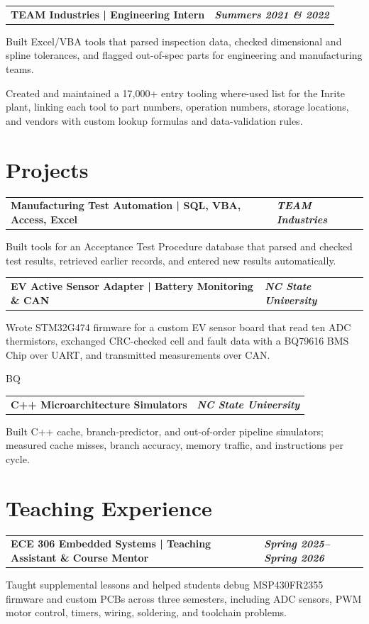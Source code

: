 \documentclass[10pt,letterpaper]{article}
\makeatletter
\newcommand{\resumeentry}[2]{%
  \begin{tabularx}{\textwidth}{@{}X>{\raggedleft\arraybackslash}p{2.40in}@{}}
    \textbf{#1} & \textbf{\textit{#2}}
  \end{tabularx}\vspace{-0.075cm}
}
\makeatother
\begin{document}
\resumeentry{TEAM Industries | Engineering Intern}{Summers 2021 \& 2022}
\begin{resumebullets}
  \item Built Excel/VBA tools that parsed inspection data, checked dimensional and spline tolerances, and flagged out-of-spec parts for engineering and manufacturing teams.
  \item Created and maintained a 17,000+ entry tooling where-used list for the Inrite plant, linking each tool to part numbers, operation numbers, storage locations, and vendors with custom lookup formulas and data-validation rules.
\end{resumebullets}

\section{Projects}
\resumeentry{Manufacturing Test Automation | SQL, VBA, Access, Excel}{TEAM Industries}
\begin{resumebullets}
  \item Built tools for an Acceptance Test Procedure database that parsed and checked test results, retrieved earlier records, and entered new results automatically.
\end{resumebullets}

\resumeentry{EV Active Sensor Adapter | Battery Monitoring \& CAN}{NC State University}
\begin{resumebullets}
  \item Wrote STM32G474 firmware for a custom EV sensor board that read ten ADC thermistors, exchanged CRC-checked cell and fault data with a BQ79616 BMS Chip over UART, and transmitted measurements over CAN.
\end{resumebullets}
BQ
\resumeentry{C++ Microarchitecture Simulators}{NC State University}
\begin{resumebullets}
  \item Built C++ cache, branch-predictor, and out-of-order pipeline simulators; measured cache misses, branch accuracy, memory traffic, and instructions per cycle.
\end{resumebullets}

\section{Teaching Experience}
\resumeentry{ECE 306 Embedded Systems | Teaching Assistant \& Course Mentor}{Spring 2025--Spring 2026}
\begin{resumebullets}
  \item Taught supplemental lessons and helped students debug MSP430FR2355 firmware and custom PCBs across three semesters, including ADC sensors, PWM motor control, timers, wiring, soldering, and toolchain problems.
\end{resumebullets}
\end{document}
